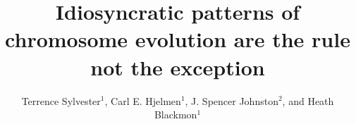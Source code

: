 \documentclass[]{rsos}%
\begin{document}
\title{Idiosyncratic patterns of chromosome evolution are the rule not the exception}

\author{%
Terrence Sylvester$^{1}$, Carl E. Hjelmen$^{1}$, J. Spencer Johnston$^{2}$, and Heath Blackmon$^{1}$}

\address{$^{1}$Department of Biology; Texas A\&M University; College Station, TX 77843, USA\\
$^{2}$Department of Entomology; Texas A\&M University; College Station, TX 77843, USA}


\subject{Evolutionary Biology}


\end{document}
